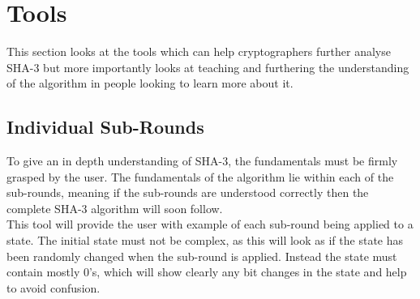 \section{Tools}
This section looks at the tools which can help cryptographers further analyse SHA-3 but more importantly looks at teaching and furthering the understanding of the algorithm in people looking to learn more about it.
\subsection{Individual Sub-Rounds}
To give an in depth understanding of SHA-3, the fundamentals must be firmly grasped by the user. The fundamentals of the algorithm lie within each of the sub-rounds, meaning if the sub-rounds are understood correctly then the complete SHA-3 algorithm will soon follow.
\vspace{5 mm}\\
This tool will provide the user with example of each sub-round being applied to a state. The initial state must not be complex, as this will look as if the state has been randomly changed when the sub-round is applied. Instead the state must contain mostly 0's, which will show clearly any bit changes in the state and help to avoid confusion.
